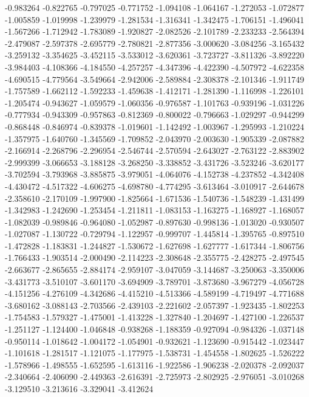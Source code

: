 -0.983264
-0.822765
-0.797025
-0.771752
-1.094108
-1.064167
-1.272053
-1.072877
-1.005859
-1.019998
-1.239979
-1.281534
-1.316341
-1.342475
-1.706151
-1.496041
-1.567266
-1.712942
-1.783089
-1.920827
-2.082526
-2.101789
-2.233233
-2.564394
-2.479087
-2.597378
-2.695779
-2.780821
-2.877356
-3.000620
-3.084256
-3.165432
-3.259132
-3.354625
-3.452115
-3.533012
-3.620361
-3.723727
-3.811326
-3.892220
-3.984403
-4.108366
-4.184550
-4.257257
-4.347396
-4.422390
-4.507972
-4.622358
-4.690515
-4.779564
-3.549664
-2.942006
-2.589884
-2.308378
-2.101346
-1.911749
-1.757589
-1.662112
-1.592233
-1.459638
-1.412171
-1.281390
-1.116998
-1.226101
-1.205474
-0.943627
-1.059579
-1.060356
-0.976587
-1.101763
-0.939196
-1.031226
-0.777934
-0.943309
-0.957863
-0.812369
-0.800022
-0.796663
-1.029297
-0.944299
-0.868448
-0.846974
-0.839378
-1.019601
-1.142492
-1.003967
-1.295993
-1.210224
-1.357975
-1.640760
-1.345569
-1.709852
-2.043970
-2.003630
-1.905339
-2.087882
-2.166914
-2.268796
-2.296954
-2.546744
-2.570594
-2.643027
-2.763122
-2.883902
-2.999399
-3.066653
-3.188128
-3.268250
-3.338852
-3.431726
-3.523246
-3.620177
-3.702594
-3.793968
-3.885875
-3.979051
-4.064076
-4.152738
-4.237852
-4.342408
-4.430472
-4.517322
-4.606275
-4.698780
-4.774295
-3.613464
-3.010917
-2.644678
-2.358610
-2.170109
-1.997900
-1.825664
-1.671536
-1.540736
-1.548239
-1.431499
-1.342983
-1.242690
-1.253454
-1.211811
-1.083153
-1.163275
-1.168927
-1.168057
-1.082039
-0.989846
-0.964080
-1.052987
-0.897630
-0.998136
-1.013020
-0.930507
-1.027087
-1.130722
-0.729794
-1.122957
-0.999707
-1.445814
-1.395765
-0.897510
-1.472828
-1.183831
-1.244827
-1.530672
-1.627698
-1.627777
-1.617344
-1.806756
-1.766433
-1.903514
-2.000490
-2.114223
-2.308648
-2.355775
-2.428275
-2.497545
-2.663677
-2.865655
-2.884174
-2.959107
-3.047059
-3.144687
-3.250063
-3.350006
-3.431773
-3.510107
-3.601170
-3.694909
-3.789701
-3.873680
-3.967279
-4.056728
-4.151256
-4.276109
-4.342686
-4.415210
-4.513366
-4.589199
-4.719497
-4.771688
-3.680162
-3.088143
-2.703566
-2.439103
-2.221602
-2.057397
-1.923435
-1.802253
-1.754583
-1.579327
-1.475001
-1.413228
-1.327840
-1.204697
-1.427100
-1.226537
-1.251127
-1.124400
-1.046848
-0.938268
-1.188359
-0.927094
-0.984326
-1.037148
-0.950114
-1.018642
-1.004172
-1.054901
-0.932621
-1.123690
-0.915442
-1.023447
-1.101618
-1.281517
-1.121075
-1.177975
-1.538731
-1.454558
-1.802625
-1.526222
-1.578966
-1.498555
-1.652595
-1.613116
-1.922586
-1.906238
-2.020378
-2.092037
-2.340664
-2.406090
-2.449363
-2.616391
-2.725973
-2.802925
-2.976051
-3.010268
-3.129510
-3.213616
-3.329041
-3.412624
